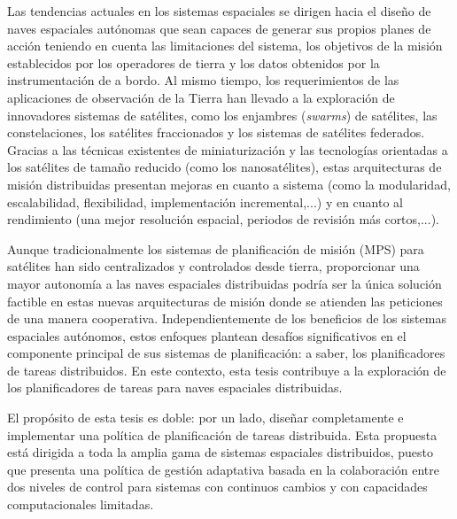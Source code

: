 \documentclass[
10pt, %
english, %
singlespacing, %
parskip, %
headsepline, %
]{MastersDoctoralThesis} %
\begin{document}


\begin{abstractes}

Las tendencias actuales en los sistemas espaciales se dirigen hacia el diseño de naves espaciales autónomas que sean capaces de generar sus propios planes de acción teniendo en cuenta las limitaciones del sistema, los objetivos de la misión establecidos por los operadores de tierra y los datos obtenidos por la instrumentación de a bordo. Al mismo tiempo, los requerimientos de las aplicaciones de observación de la Tierra han llevado a la exploración de innovadores sistemas de satélites, como los enjambres (\emph{swarms}) de satélites, las constelaciones, los satélites fraccionados y los sistemas de satélites federados. Gracias a las técnicas existentes de miniaturización y las tecnologías orientadas a los satélites de tamaño reducido (como los nanosatélites), estas arquitecturas de misión distribuidas presentan mejoras en cuanto a sistema (como la modularidad, escalabilidad, flexibilidad, implementación incremental,...) y en cuanto al rendimiento (una mejor resolución espacial, periodos de revisión más cortos,...).

Aunque tradicionalmente los sistemas de planificación de misión (MPS) para satélites han sido centralizados y controlados desde tierra, proporcionar una mayor autonomía a las naves espaciales distribuidas podría ser la única solución factible en estas nuevas arquitecturas de misión donde se atienden las peticiones de una manera cooperativa. Independientemente de los beneficios de los sistemas espaciales autónomos, estos enfoques plantean desafíos significativos en el componente principal de sus sistemas de planificación: a saber, los planificadores de tareas distribuidos. En este contexto, esta tesis contribuye a la exploración de los planificadores de tareas para naves espaciales distribuidas.

El propósito de esta tesis es doble: por un lado, diseñar completamente e implementar una política de planificación de tareas distribuida. Esta propuesta está dirigida a toda la amplia gama de sistemas espaciales distribuidos, puesto que presenta una política de gestión adaptativa basada en la colaboración entre dos niveles de control para sistemas con continuos cambios y con capacidades computacionales limitadas.


\end{abstractes}
\end{document}
